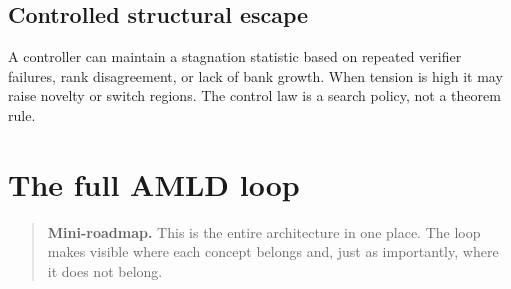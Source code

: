 \documentclass[11pt,openany]{book}
\theoremstyle{definition}
\theoremstyle{remark}
\newenvironment{miniroadmap}{\begin{quote}\small\color{deepblue}\textbf{Mini-roadmap.} }{\end{quote}}
\begin{document}
\section{Controlled structural escape}
A controller can maintain a stagnation statistic based on repeated verifier failures, rank disagreement, or lack of bank growth. When tension is high it may raise novelty or switch regions. The control law is a search policy, not a theorem rule.

\chapter{The full AMLD loop}
\begin{miniroadmap}
This is the entire architecture in one place. The loop makes visible where each concept belongs and, just as importantly, where it does not belong.
\end{miniroadmap}
\end{document}
